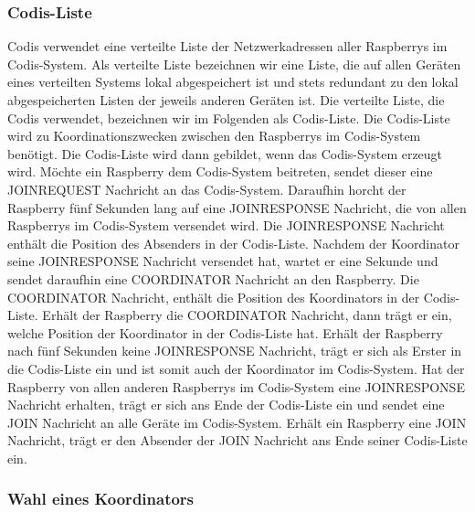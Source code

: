 \documentclass[journal]{IEEEtran}
\begin{document}
\subsubsection{Codis-Liste}

Codis verwendet eine verteilte Liste der Netzwerkadressen aller Raspberrys im Codis-System. Als verteilte Liste bezeichnen wir eine Liste, die auf allen Geräten eines verteilten Systems lokal abgespeichert ist und stets redundant zu den lokal abgespeicherten Listen der jeweils anderen Geräten ist. Die verteilte Liste, die Codis verwendet, bezeichnen wir im Folgenden als Codis-Liste. Die Codis-Liste wird zu Koordinationszwecken zwischen den Raspberrys im Codis-System benötigt.
Die Codis-Liste wird dann gebildet, wenn das Codis-System erzeugt wird. Möchte ein Raspberry dem Codis-System beitreten, sendet dieser eine \MakeUppercase{joinrequest} Nachricht an das Codis-System. Daraufhin horcht der Raspberry fünf Sekunden lang auf eine \MakeUppercase{joinresponse} Nachricht, die von allen Raspberrys im Codis-System versendet wird. Die \MakeUppercase{joinresponse} Nachricht enthält die Position des Absenders in der Codis-Liste. Nachdem der Koordinator seine \MakeUppercase{joinresponse} Nachricht versendet hat, wartet er eine Sekunde und sendet daraufhin eine \MakeUppercase{coordinator} Nachricht an den Raspberry. Die \MakeUppercase{coordinator} Nachricht, enthält die Position des Koordinators in der Codis-Liste. Erhält der Raspberry die \MakeUppercase{coordinator} Nachricht, dann trägt er ein, welche Position der Koordinator in der Codis-Liste hat. Erhält der Raspberry nach fünf Sekunden keine \MakeUppercase{joinresponse} Nachricht, trägt er sich als Erster in die Codis-Liste ein und ist somit auch der Koordinator im Codis-System. Hat der Raspberry von allen anderen Raspberrys im Codis-System eine \MakeUppercase{joinresponse} Nachricht erhalten, trägt er sich ans Ende der Codis-Liste ein und sendet eine \MakeUppercase{join} Nachricht an alle Geräte im Codis-System. Erhält ein Raspberry eine \MakeUppercase{join} Nachricht, trägt er den Absender der \MakeUppercase{join} Nachricht ans Ende seiner Codis-Liste ein.

\subsubsection{Wahl eines Koordinators}
\end{document}
